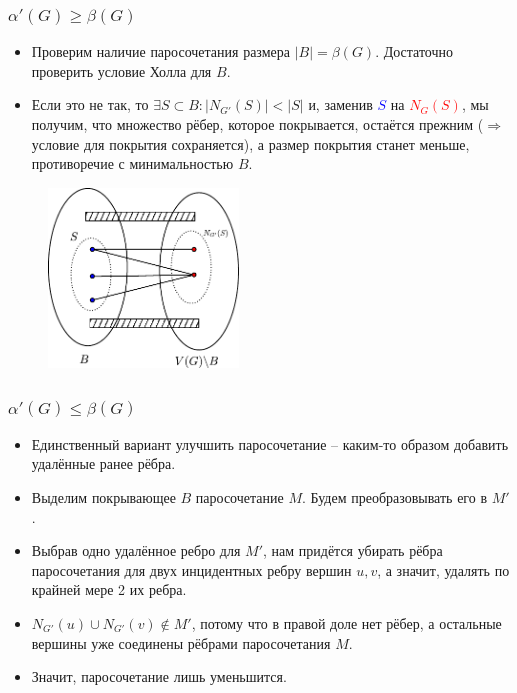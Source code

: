 \begin{frame}[t]
    \small
    \frametitle{$\alpha'(G) \geq \beta(G)$}
    \begin{itemize}
        \item Проверим наличие паросочетания размера $|B| = \beta(G)$. Достаточно проверить условие Холла для $B$.
        \item Если это не так, то $\exists S \subset B: |N_{G'}(S)| < |S|$ и, заменив \textcolor{blue}{$S$} на \textcolor{red}{$N_G(S)$}, мы получим, что множество рёбер, которое покрывается, остаётся прежним ($ \Rightarrow $ условие для покрытия сохраняется), а размер покрытия станет меньше, противоречие с минимальностью $B$. 
    \end{itemize}
    \vspace{-5mm}
    \begin{figure}[h]
        \centering
        \includegraphics[width=0.45\textwidth]{images/hall}
        \label{fig:hall}
    \end{figure}
    
\end{frame}

\begin{frame}[t]
    \small
    \frametitle{$\alpha'(G) \leq \beta(G)$}

    \begin{itemize}
        \item Единственный вариант улучшить паросочетание -- каким-то образом добавить удалённые ранее рёбра. 
        \item Выделим покрывающее $B$ паросочетание $M$. Будем преобразовывать его в $M'$.
        \item Выбрав одно удалённое ребро для $M'$, нам придётся убирать рёбра паросочетания для двух инцидентных ребру вершин $u, v$, а значит, удалять по крайней мере 2 их ребра. 
        \item  $N_{G'}(u) \cup N_{G'}(v) \notin M'$, потому что в правой доле нет рёбер, а остальные вершины уже соединены рёбрами паросочетания $M$. 
        \item Значит, паросочетание лишь уменьшится.
    \hfill \qedsymbol{}
    \end{itemize}
\end{frame}

